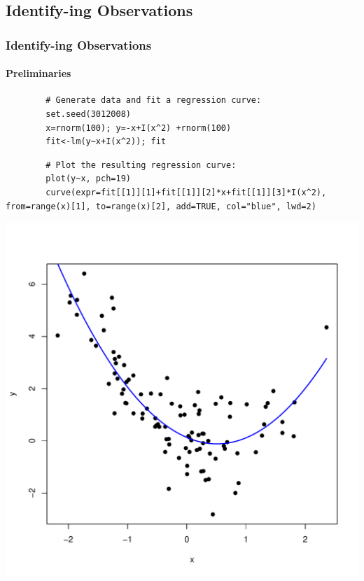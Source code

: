 \subsection{\ttfamily Identify\normalfont-ing Observations}
\begin{frame}
\frametitle{\ttfamily Identify\normalfont-ing Observations}
\framesubtitle{Preliminaries}
	\begin{lstlisting}
		# Generate data and fit a regression curve:
		set.seed(3012008)
		x=rnorm(100); y=-x+I(x^2) +rnorm(100)
		fit<-lm(y~x+I(x^2)); fit
	\end{lstlisting}

\begin{center}
\end{center}
\normalsize

	\begin{lstlisting}
		# Plot the resulting regression curve:
		plot(y~x, pch=19)
		curve(expr=fit[[1]][1]+fit[[1]][2]*x+fit[[1]][3]*I(x^2), from=range(x)[1], to=range(x)[2], add=TRUE, col="blue", lwd=2)
	\end{lstlisting}

\newpage
\begin{center}
\includegraphics[scale=0.35]{images/xyPlot.pdf}
\end{center}

\end{frame}

